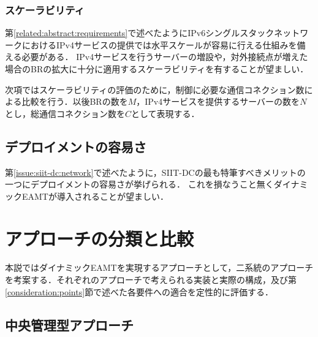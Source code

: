 \subsubsection{スケーラビリティ}
第\ref{related:abstract:requirements}で述べたようにIPv6シングルスタックネットワークにおけるIPv4サービスの提供では水平スケールが容易に行える仕組みを備える必要がある．
IPv4サービスを行うサーバーの増設や，対外接続点が増えた場合のBRの拡大に十分に適用するスケーラビリティを有することが望ましい．

次項ではスケーラビリティの評価のために，制御に必要な通信コネクション数による比較を行う．以後BRの数を$M$，IPv4サービスを提供するサーバーの数を$N$とし，総通信コネクション数を$C$として表現する．


%

\subsection{デプロイメントの容易さ}
第\ref{issue:siit-dc:network}で述べたように，SIIT-DCの最も特筆すべきメリットの一つにデプロイメントの容易さが挙げられる．
これを損なうこと無くダイナミックEAMTが導入されることが望ましい．


\section{アプローチの分類と比較}
本説ではダイナミックEAMTを実現するアプローチとして，二系統のアプローチを考案する．それぞれのアプローチで考えられる実装と実際の構成，及び第\ref{consideration:points}節で述べた各要件への適合を定性的に評価する．



\subsection{中央管理型アプローチ}
\label{consideration:approach:centerized}

